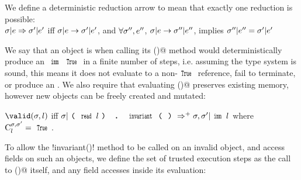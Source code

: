 %
%
We define a deterministic reduction arrow to mean that exactly one reduction is possible:\\
\indent $\sigma|e \Rightarrow \sigma'|e'$ iff $\sigma|e \rightarrow \sigma'|e'$, and $\forall \sigma'', e''$, $\sigma|e \rightarrow \sigma''|e''$, implies $\sigma''|e'' = \sigma'|e'$\\

\LS

\noindent We say that an object is \valid when calling its \Q@invariant()@ method would
deterministically produce an $\Kw{imm}\,\Kw{True}$ in a finite number of steps, i.e. assuming the type system is sound, this means it does not evaluate to a non-$\Kw{True}$ reference, fail to terminate, or produce an \error.
We also require that evaluating \Q@invariant()@ preserves existing memory, however new objects can be freely created and mutated:

\indent$\valid(\s,l)$ iff $\s | \invariant{l} \Rightarrow^+ \s,\s' | \Kw{imm}\,l$ where  $\C[\s,\s']{l} = \Kw{True}$.%

\noindent
To allow the \Q!invariant()! method to be called on an invalid object, and access fields on such an objects, we define the set of trusted execution steps as the call to \Q@invariant()@ itself, and any field accesses inside its evaluation:

